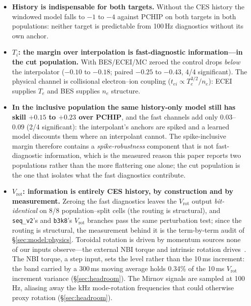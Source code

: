 \documentclass[10pt]{article}
\newcommand{\Ti}{\ensuremath{T_i}}
\newcommand{\Vrot}{\ensuremath{V_\mathrm{rot}}}
\newcommand{\seqv}{\texttt{seq\_v2}}
\newcommand{\bthree}{\texttt{b3k8}}
\begin{document}
\begin{itemize}
  \item \textbf{History is indispensable for both targets.} Without the CES
        history the windowed model falls to $-1$ to $-4$ against PCHIP on both
        targets in both populations: neither target is predictable from 100\,Hz
        diagnostics without its own anchor.
  \item \textbf{\Ti{}: the margin over interpolation is fast-diagnostic
        information---in the cut population.} With BES/ECEI/MC zeroed the
        control drops \emph{below} the interpolator ($-0.10$ to $-0.18$; paired
        $-0.25$ to $-0.43$, 4/4 significant). The physical channel is collisional
        electron--ion coupling ($t_{ei}\propto T_e^{3/2}/n_e$): ECEI supplies $T_e$
        and BES supplies $n_e$ structure.
  \item \textbf{In the inclusive population the same history-only model still
        has skill $+0.15$ to $+0.23$ over PCHIP}, and the fast channels add only
        $0.03$--$0.09$ (2/4 significant): the interpolant's anchors are spiked and a
        learned model discounts them where an interpolant cannot. The
        spike-inclusive margin therefore contains a \emph{spike-robustness}
        component that is not fast-diagnostic information, which is the measured
        reason this paper reports two populations rather than the more flattering
        one alone; the cut population is the one that isolates what the fast
        diagnostics contribute.
  \item \textbf{\Vrot{}: information is entirely CES history, by construction and
        by measurement.} Zeroing the fast diagnostics leaves the \Vrot{} output
        \emph{bit-identical} on 8/8 population--split cells (the routing is
        structural), and \seqv{}'s and \bthree{}'s \Vrot{} branches pass the same
        perturbation test; since the routing is structural, the measurement behind
        it is the term-by-term audit of \S\ref{sec:model:physics}. Toroidal rotation
        is driven by momentum sources none of our inputs observe---the external NBI
        torque and intrinsic rotation drives~\citep{Rice2007IntermachineComparison}.
        The NBI torque, a step input, sets the level rather than the 10\,ms
        increment: the band carried by a 300\,ms moving average holds 0.34\% of the
        10\,ms \Vrot{} increment variance (\S\ref{sec:headroom}). The Mirnov signals are
        sampled at 100\,Hz, aliasing away the kHz mode-rotation frequencies that
        could otherwise proxy rotation (\S\ref{sec:headroom}).
\end{itemize}
\end{document}

